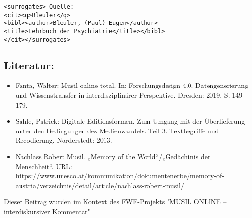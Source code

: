 \documentclass{article}
\begin{document}
        \begin{verbatim}<surrogates> Quelle:
<cit><q>Bleuler</q>
<bibl><author>Bleuler, (Paul) Eugen</author>
<title>Lehrbuch der Psychiatrie</title></bibl>
</cit></surrogates>\end{verbatim}\subsection*{Literatur:}\begin{itemize}\item Fanta, Walter: Musil online total. In: Forschungsdesign 4.0. Datengenerierung und
                              Wissenstransfer in interdisziplinärer Perspektive. Dresden: 2019, S. 149–179.\item Sahle, Patrick: Digitale Editionsformen. Zum Umgang mit der
                              Überlieferung unter den Bedingungen des Medienwandels. Teil 3:
                              Textbegriffe und Recodierung. Norderstedt: 2013.\item Nachlass Robert Musil. „Memory of the World“/„Gedächtnis
                              der Menschheit“. URL: \url{https://www.unesco.at/kommunikation/dokumentenerbe/memory-of-austria/verzeichnis/detail/article/nachlass-robert-musil/}\end{itemize}Dieser Beitrag wurden im Kontext des FWF-Projekts "MUSIL ONLINE – interdiskursiver Kommentar" 
\end{document}

